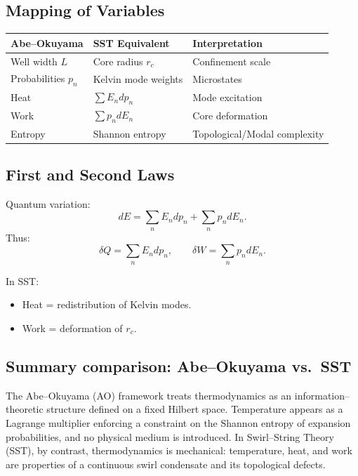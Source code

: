 \documentclass[11pt]{article}
\newcommand{\rc}{r_c}                                    %
\begin{document}
        \subsection{Mapping of Variables}

            \begin{center}
                \begin{tabular}{lll}
                    \hline
                    Abe--Okuyama          & SST Equivalent        & Interpretation \\
                    \hline
                    Well width $L$        & Core radius $\rc$     & Confinement scale \\
                    Probabilities $p_n$   & Kelvin mode weights   & Microstates \\
                    Heat                  & $\sum E_n dp_n$       & Mode excitation \\
                    Work                  & $\sum p_n dE_n$       & Core deformation \\
                    Entropy               & Shannon entropy       & Topological/Modal complexity \\
                    \hline
                \end{tabular}
            \end{center}

        \subsection{First and Second Laws}

            Quantum variation:
            \begin{equation}
                dE = \sum_n E_n dp_n + \sum_n p_n dE_n.
            \end{equation}
            Thus:
            \begin{equation}
                \delta Q = \sum_n E_n dp_n, \qquad
                \delta W = \sum_n p_n dE_n.
            \end{equation}

            In SST:
            \begin{itemize}
                \item Heat = redistribution of Kelvin modes.
                \item Work = deformation of $\rc$.
            \end{itemize}

        \subsection{Summary comparison: Abe--Okuyama vs.\ SST}
            The Abe--Okuyama (AO) framework treats thermodynamics as an
            information--theoretic structure defined on a fixed Hilbert space.
            Temperature appears as a Lagrange multiplier enforcing a constraint
            on the Shannon entropy of expansion probabilities, and no physical
            medium is introduced. In Swirl--String Theory (SST), by contrast,
            thermodynamics is mechanical: temperature, heat, and work are
            properties of a continuous swirl condensate and its topological
            defects.
\end{document}
